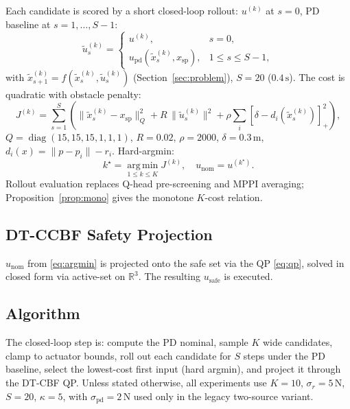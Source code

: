 \documentclass[11pt,onecolumn,a4paper]{article}
\newcommand{\R}{\mathbb{R}}
\newcommand{\spt}{\mathrm{sp}}
\newcommand{\pd}{\mathrm{pd}}
\newcommand{\nom}{\mathrm{nom}}
\newcommand{\safe}{\mathrm{safe}}
\begin{document}
Each candidate is scored by a short closed-loop rollout: $u^{(k)}$ at
$s=0$, PD baseline at $s=1,\dots,S-1$:
\begin{equation}\label{eq:rollout}
\tilde{u}_s^{(k)} =
\begin{cases}
u^{(k)}, & s = 0, \\
u_\pd(\tilde{x}_s^{(k)}, x_\spt), & 1 \le s \le S-1,
\end{cases}
\end{equation}
with $\tilde{x}_{s+1}^{(k)} = f(\tilde{x}_s^{(k)}, \tilde{u}_s^{(k)})$
(Section~\ref{sec:problem}), $S = 20$ ($0.4\,\mathrm{s}$). The cost is quadratic
with obstacle penalty:
\begin{equation}\label{eq:cost}
J^{(k)} = \sum_{s=1}^{S}\!\!\left(\!\|\tilde{x}_s^{(k)} - x_\spt\|_Q^2
+ R\,\|\tilde{u}_s^{(k)}\|^2
+ \rho \sum_i [\delta - d_i(\tilde{x}_s^{(k)})]_+^2\!\right),
\end{equation}
$Q = \operatorname{diag}(15,15,15,1,1,1)$, $R = 0.02$, $\rho = 2000$,
$\delta = 0.3\,\mathrm{m}$, $d_i(x) = \|p - p_i\| - r_i$. Hard-argmin:
\begin{equation}\label{eq:argmin}
k^\star = \operatorname*{arg\,min}_{1 \le k \le K} J^{(k)},
\quad u_\nom = u^{(k^\star)}.
\end{equation}
Rollout evaluation replaces Q-head pre-screening and MPPI averaging;
Proposition~\ref{prop:mono} gives the monotone $K$-cost relation.

\subsection{DT-CCBF Safety Projection}

$u_\nom$ from \eqref{eq:argmin} is projected onto the safe set via
the QP \eqref{eq:qp}, solved in closed form via active-set on $\R^3$.
The resulting $u_\safe$ is executed.

\subsection{Algorithm}

The closed-loop step is: compute the PD nominal, sample $K$ wide
candidates, clamp to actuator bounds, roll out each candidate for $S$
steps under the PD baseline, select the lowest-cost first input
(hard argmin), and project it through the DT-CBF QP. Unless stated
otherwise, all experiments use $K = 10$, $\sigma_r = 5\,\mathrm{N}$, $S = 20$,
$\kappa = 5$, with $\sigma_\pd = 2\,\mathrm{N}$ used only in the legacy
two-source variant.
\label{alg:tsh}
\end{document}
